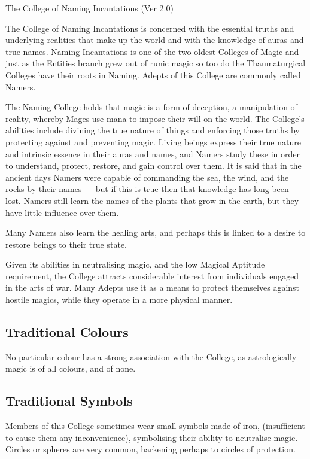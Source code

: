 \begin{Chapter}{The College of Naming Incantations (Ver 2.0)}

The College of Naming Incantations is concerned with the essential
truths and underlying realities that make up the world and with the
knowledge of auras and true names.  Naming Incantations is one of the
two oldest Colleges of Magic and just as the Entities branch grew out
of runic magic so too do the Thaumaturgical Colleges have their roots
in Naming.  Adepts of this College are commonly called Namers.

The Naming College holds that magic is a form of deception, a
manipulation of reality, whereby Mages use mana to impose their will
on the world.  The College’s abilities include divining the true
nature of things and enforcing those truths by protecting against and
preventing magic.  Living beings express their true nature and
intrinsic essence in their auras and names, and Namers study these in
order to understand, protect, restore, and gain control over them. It
is said that in the ancient days Namers were capable of commanding the
sea, the wind, and the rocks by their names — but if this is true then
that knowledge has long been lost.  Namers still learn the names of
the plants that grow in the earth, but they have little influence over
them.

Many Namers also learn the healing arts, and perhaps this is linked to
a desire to restore beings to their true state.

Given its abilities in neutralising magic, and the low Magical
Aptitude requirement, the College attracts considerable interest from
individuals engaged in the arts of war. Many Adepts use it as a means
to protect themselves against hostile magics, while they operate in a
more physical manner.

\subsection{Traditional Colours}

No particular colour has a strong association with the College, as
astrologically magic is of all colours, and of none.

\subsection{Traditional Symbols}

Members of this College sometimes wear small symbols made of iron,
(insufficient to cause them any inconvenience), symbolising their
ability to neutralise magic. Circles or spheres are very common,
harkening perhaps to circles of protection.


\end{Chapter}
